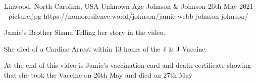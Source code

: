 {Linwood, North Carolina, USA}
{Unknown Age}
{Johnson \& Johnson }
{26th May 2021 }
{-}
{picture.jpg}
{https://nomoresilence.world/johnson/jamie-webb-johnson-johnson/}
{


Jamie’s Brother Shane Telling her story in the video.

She died of a Cardiac Arrest within 13 hours of the J \& J Vaccine.

At the end of this video is Jamie’s vaccination card and death certificate showing that she took the Vaccine on 26th May and died on 27th May
}
